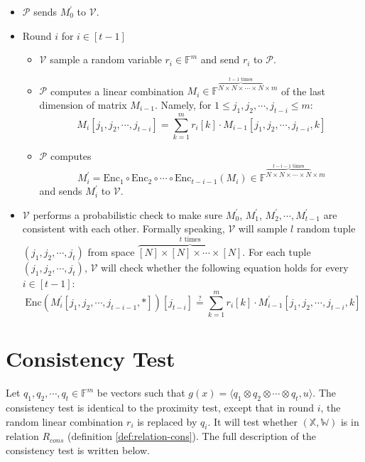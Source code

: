 \begin{itemize}
    \item $\mathcal{P}$ sends $M_0^{\prime}$ to $\mathcal{V}$.
    
    \item Round $i$ for $i \in [t-1]$
    
    \begin{itemize}
        \item $\mathcal{V}$ sample a random variable $r_i \in \mathbb{F}^m$ and send $r_i$ to $\mathcal{P}$.
        \item $\mathcal{P}$ computes a linear combination 
        $M_i \in \mathbb{F}^{\overbrace{N \times N \times \cdots \times N}^{t-1 \text{ times}} \times m}$ of the last dimension of matrix $M_{i-1}$.
        Namely, for $1 \le j_1,j_2, \cdots, j_{t-i} \le m$:
$$
    M_i[j_1,j_2, \cdots, j_{t-i}] = \sum_{k=1}^{m} r_{i}[k] \cdot M_{i-1}[j_1,j_2, \cdots, j_{t-i}, k]
$$

        \item $\mathcal{P}$ computes 
$$
    M_i^\prime = \text{Enc}_1 \circ \text{Enc}_2 \circ \cdots \circ \text{Enc}_{t - i - 1}(M_i)\in \mathbb{F}^{\overbrace{N \times N \times \cdots \times N}^{t-i-1 \text{ times}} \times m}
$$    
        and sends $M_i^\prime$ to $\mathcal{V}$.
    \end{itemize}
    
    \item $\mathcal{V}$ performs a probabilistic check to make sure $M_0^\prime$, $M_1^\prime$, $M_2^\prime, \cdots, M_{t-1}^\prime$ are consistent with each other. Formally speaking, $\mathcal{V}$ will sample $l$ random tuple $(j_1, j_2, \cdots, j_t)$ from space $\overbrace{[N] \times [N] \times \cdots \times [N]}^{t \text{ times}}$. 
    For each tuple $(j_1, j_2, \cdots, j_t)$, 
    $\mathcal{V}$ will check whether the following equation holds for every $i \in [t-1]$:
$$
    \text{Enc}(M_i^\prime[j_1, j_2, \cdots, j_{t-i-1}, *])[j_{t-i}] \stackrel{?}{=} \sum_{k=1}^m r_i[k] \cdot M_{i-1}^{\prime}[j_1,j_2, \cdots, j_{t-i},k]
$$
\end{itemize}

\section{Consistency Test}

Let $q_1, q_2, \cdots, q_t \in \mathbb{F}^{m}$ be vectors such that $g(x) =\langle q_1 \otimes q_2 \otimes \cdots \otimes q_t, u \rangle $. The consistency test is identical to the proximity test, except that in round $i$, the random linear combination $r_i$ is replaced by $q_i$. It will test whether $(\mathbb{X}, \mathbb{W})$ is in relation $R_{cons}$ (definition \ref{def:relation-cons}). The full description of the consistency test is written below.

